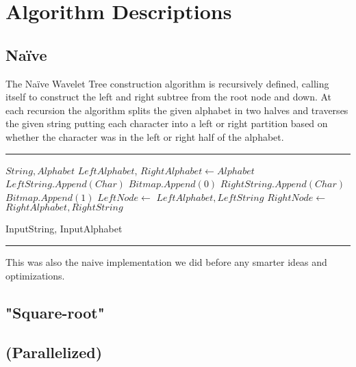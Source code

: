 \section{Algorithm Descriptions}

\subsection{Naïve}
The Naïve Wavelet Tree construction algorithm is recursively defined, calling itself to construct the left and right subtree from the root node and down. At each recursion the algorithm splits the given alphabet in two halves and traverses the given string putting each character into a left or right partition based on whether the character was in the left or right half of the alphabet.

\noindent\rule{\textwidth}{0.5pt}
\begin{algorithmic}
 {$String, Alphabet$}
\State $LeftAlphabet$, $RightAlphabet \gets Alphabet$
\State $LeftString.Append(Char)$
\State $Bitmap.Append(0)$
\Else
\State $RightString.Append(Char)$
\State $Bitmap.Append(1)$
\EndIf
\EndFor
\State $LeftNode \gets$  {$LeftAlphabet, LeftString$}
\State $RightNode \gets$  {$RightAlphabet, RightString$}
\EndFunction

\State {} {InputString, InputAlphabet}
\end{algorithmic}
\noindent\rule{\textwidth}{0.5pt}
\linebreak

\noindent This was also the naive implementation we did before any smarter ideas and optimizations.

\subsection{"Square-root"}

\subsection{(Parallelized)}